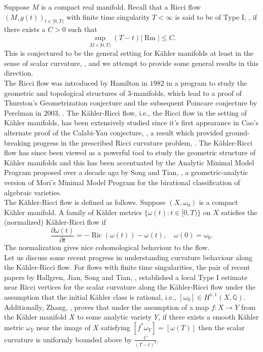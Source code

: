 \documentclass[12pt]{article}
\numberwithin{equation}{section}
\newcommand{\Q}{\mathbb{Q}}
\renewcommand{\d}{\partial}
\DeclareMathOperator{\Ric}{Ric}
\DeclareMathOperator{\Rm}{Rm}
\begin{document}
Suppose $M$ is a compact real manifold. Recall that a Ricci flow $(M, g(t))_{t\in [0,T)}$ with finite time singularity $T < \infty$ is said to be of Type I, \cite{CK04}, if there exists a $C > 0$ such that
\begin{equation*}
    \sup_{M\times[0,T)} (T-t)|\Rm| \leq C.
\end{equation*}
This is conjectured to be the general setting for K\"ahler manifolds at least in the sense of scalar curvature, \cite[Conj 1.1]{JST23}, and we attempt to provide some general results in this direction.\\
\indent The Ricci flow was introduced by Hamilton in $1982$ in a program to study the geometric and topological structures of $3$-manifolds, which lead to a proof of Thurston's Geometrization conjecture and the subsequent Poincare conjecture by Perelman in $2003$, \cite{P02, P031, P032}. The K\"ahler-Ricci flow, i.e., the Ricci flow in the setting of K\"ahler manifolds, has been extensively studied since it's first appearance in Cao's alternate proof of the Calabi-Yau conjecture, \cite{C85}, a result which provided ground-breaking progress in the prescribed Ricci curvature problem, \cite{Y78, T00}. The K\"ahler-Ricci flow has since been viewed as a powerful tool to study the geometric structure of K\"ahler manifolds and this has been accentuated by the Analytic Minimal Model Program proposed over a decade ago by Song and Tian, \cite{ST07}, a geometric-analytic version of Mori's Minimal Model Program for the birational classification of algebraic varieties.\\
\indent The K\"ahler-Ricci flow is defined as follows. Suppose $(X, \omega_0)$ is a compact K\"ahler manifold. A family of K\"ahler metrics $\{\omega(t): t \in [0,T)\}$ on $X$ satisfies the (normalized) K\"ahler-Ricci flow if
\begin{equation}\label{KRF}\tag{KRF}
    \frac{\d \omega(t)}{\d t} = -\Ric(\omega(t)) - \omega(t), \quad \omega(0) = \omega_0.
\end{equation}
The normalization gives nice cohomological behaviour to the flow.\\ \indent Let us discuss some recent progress in understanding curvature behaviour along the K\"ahler-Ricci flow. For flows with finite time singularities, the pair of recent papers by Hallgren, Jian, Song and Tian, \cite{JST23, HJST23}, established a local Type I estimate near Ricci vertices for the scalar curvature along the K\"ahler-Ricci flow under the assumption that the initial K\"ahler class is rational, i.e., $[\omega_0] \in H^{1,1}(X,\Q)$. Additionally, Zhang, \cite{Z10}, proves that under the assumption of a map $f:X\to Y$ from the K\"ahler manifold $X$ to some analytic variety $Y$, if there exists a smooth K\"ahler metric $\omega_Y$ near the image of $X$ satisfying $[f^*\omega_Y] = [\omega(T)]$ then the scalar curvature is uniformly bounded above by $\frac{C}{(T-t)^2}$.\\
\end{document}
